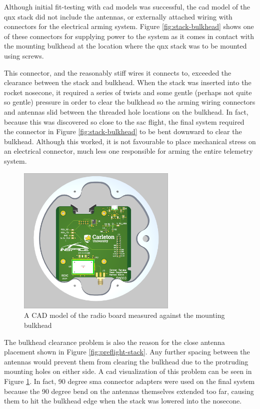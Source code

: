 Although initial fit-testing with \gls{cad} models was successful, the \gls{cad} model of the \gls{qnx} stack did not
include the antennas, or externally attached wiring with connectors for the electrical arming system. Figure
\ref{fig:stack-bulkhead} shows one of these connectors for supplying power to the system as it comes in contact with
the mounting bulkhead at the location where the \gls{qnx} stack was to be mounted using screws.

This connector, and the reasonably stiff wires it connects to, exceeded the clearance between the stack and bulkhead.
When the stack was inserted into the rocket nosecone, it required a series of twists and some gentle (perhaps not quite
so gentle) pressure in order to clear the bulkhead so the arming wiring connectors and antennas slid between the
threaded hole locations on the bulkhead. In fact, because this was discovered so close to the \gls{sac} flight, the
final system required the connector in Figure \ref{fig:stack-bulkhead} to be bent downward to clear the bulkhead.
Although this worked, it is not favourable to place mechanical stress on an electrical connector, much less one
responsible for arming the entire telemetry system.

\begin{figure}[H]
    \center
    \includegraphics[width=3in]{assets/images/rad-cad.png}
    \caption{A CAD model of the radio board measured against the mounting bulkhead}
    \label{fig:rad-cad}
\end{figure}

The bulkhead clearance problem is also the reason for the close antenna placement shown in Figure
\ref{fig:preflight-stack}. Any further spacing between the antennas would prevent them from clearing the bulkhead due
to the protruding mounting holes on either side. A \gls{cad} visualization of this problem can be seen in Figure
\ref{fig:rad-cad}. In fact, 90 degree \gls{sma} connector adapters were used on the final system because the 90 degree
bend on the antennas themselves extended too far, causing them to hit the bulkhead edge when the stack was lowered into
the nosecone.

